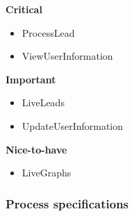 \documentclass{article}
\begin{document}
		\begin{flushleft}
			\textbf{Critical}
				\begin{itemize}
					\item ProcessLead
					\item ViewUserInformation
				\end{itemize}
			\textbf{Important}
				\begin{itemize}
					\item LiveLeads
					\item UpdateUserInformation
				\end{itemize}
			\textbf{Nice-to-have}
				\begin{itemize}
					\item LiveGraphs
				\end{itemize}
		\end{flushleft}

		
		\subsubsection{Process specifications}
\end{document}
